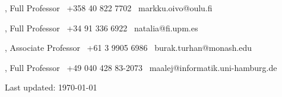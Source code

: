 \documentclass[9pt]{article}
\begin{document}
\bigskip
{}
\noindent\begin{minipage}[t]{2.5in}
, Full Professor
\newline{}
\newline\noindent \faPhone~+358 40 822 7702
\newline\noindent \faEnvelope~markku.oivo@oulu.fi
\end{minipage}
\hfill
\begin{minipage}[t]{2.5in}
, Full Professor
\newline{}
\newline\noindent \faPhone~+34 91 336 6922
\newline\noindent \faEnvelope~natalia@fi.upm.es
\end{minipage}

\bigskip
\medskip

\noindent\begin{minipage}[t]{2.5in}
  , Associate Professor
  \newline{}
  \newline\noindent \faPhone~+61 3 9905 6986
  \newline\noindent \faEnvelope~burak.turhan@monash.edu	
  \end{minipage}
\hfill
\noindent\begin{minipage}[t]{2.5in}
  , Full Professor
  \newline{}
  \newline\noindent \faPhone~+49 040 428 83-2073
  \newline\noindent \faEnvelope~maalej@informatik.uni-hamburg.de	
  \end{minipage}

  \begin{center}
    {\scriptsize  Last updated: \today\ }
    \end{center}
\end{document}

